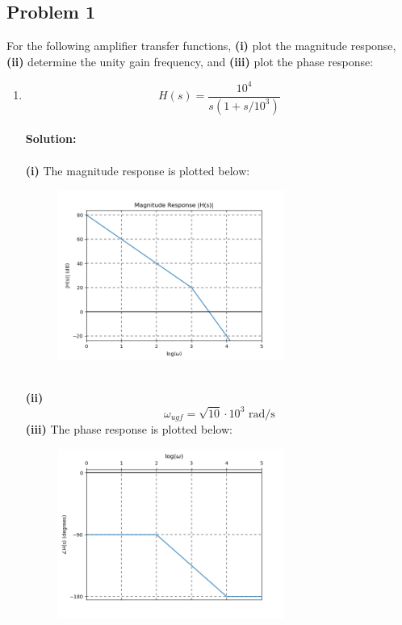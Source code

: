 \documentclass{article}
\begin{document}
\subsection*{Problem 1}
For the following amplifier transfer functions, \textbf{(i)} plot the magnitude response, \textbf{(ii)} determine the unity gain frequency, and \textbf{(iii)} plot the phase response:
\begin{enumerate}[label=\textbf{(\alph*)}]
    \item $$H(s) = \frac{10^4}{s(1+s/10^3)}$$
    \\ \textbf{Solution:}\\ \\
    \textbf{(i)} The magnitude response is plotted below:
    \begin{figure}[!h]
    \centering
    \includegraphics[width=0.7\textwidth]{figures/ece342_cc_mag_a.png}
    \end{figure} \\
    \textbf{(ii)} 
    $$\boxed{\omega_{ugf} = \sqrt{10} \cdot 10^3 \text{ rad/s}}$$
    \newpage
    \textbf{(iii)} The phase response is plotted below:
    \begin{figure}[!h]
    \centering
    \includegraphics[width=0.7\textwidth]{figures/cc_phase_a.png}

\end{figure}
\end{enumerate}
\end{document}
